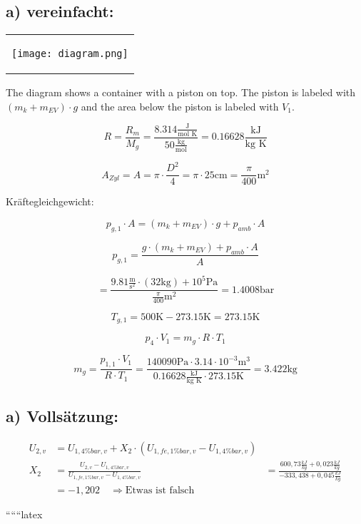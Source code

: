 \subsection*{a) vereinfacht:}

\begin{center}
\begin{tabular}{c}
\begin{minipage}{0.3\textwidth}
\begin{center}
\texttt{[image: diagram.png]}
\end{center}
\end{minipage}
\end{tabular}
\end{center}

\noindent
The diagram shows a container with a piston on top. The piston is labeled with $(m_k + m_{EV}) \cdot g$ and the area below the piston is labeled with $V_1$.

\[
R = \frac{R_m}{M_g} = \frac{8.314 \frac{\text{J}}{\text{mol K}}}{50 \frac{\text{kg}}{\text{mol}}} = 0.16628 \frac{\text{kJ}}{\text{kg K}}
\]

\[
A_{Zyl} = A = \pi \cdot \frac{D^2}{4} = \pi \cdot 25 \text{cm} = \frac{\pi}{400} \text{m}^2
\]

\noindent
Kräftegleichgewicht:

\[
p_{g,1} \cdot A = (m_k + m_{EV}) \cdot g + p_{amb} \cdot A
\]

\[
p_{g,1} = \frac{g \cdot (m_k + m_{EV}) + p_{amb} \cdot A}{A}
\]

\[
= \frac{9.81 \frac{\text{m}}{\text{s}^2} \cdot (32 \text{kg}) + 10^5 \text{Pa}}{\frac{\pi}{400} \text{m}^2} = 1.4008 \text{bar}
\]

\[
T_{g,1} = 500 \text{K} - 273.15 \text{K} = 273.15 \text{K}
\]

\[
p_{4} \cdot V_1 = m_g \cdot R \cdot T_1
\]

\[
m_g = \frac{p_{1,1} \cdot V_1}{R \cdot T_1} = \frac{140090 \text{Pa} \cdot 3.14 \cdot 10^{-3} \text{m}^3}{0.16628 \frac{\text{kJ}}{\text{kg K}} \cdot 273.15 \text{K}} = 3.422 \text{kg}
\]

\subsection*{a) Vollsätzung:}

\begin{align*}
U_{2,v} &= U_{1,4\%bar,v} + X_2 \cdot \left( U_{1,fe,1\%bar,v} - U_{1,4\%bar,v} \right) \\
X_2 &= \frac{U_{2,v} - U_{1,4\%bar,v}}{U_{1,fe,1\%bar,v} - U_{1,4\%bar,v}} &= \frac{600,73 \frac{kJ}{kg} + 0,023 \frac{kJ}{kg}}{-333,438 + 0,045 \frac{kJ}{kg}} \\
&= -1,202 \quad \Rightarrow \text{Etwas ist falsch}
\end{align*}

``````latex